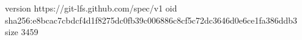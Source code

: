 version https://git-lfs.github.com/spec/v1
oid sha256:e8bcac7cbdcf4d1f8275dc0fb39c006886c8cf5c72dc3646d0e6ce1fa386ddb3
size 3459
